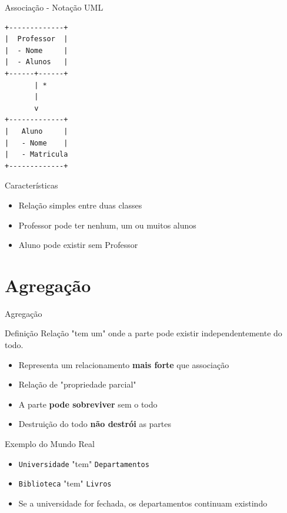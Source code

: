 \documentclass[aspectratio=169]{beamer}
\begin{document}
\begin{frame}[fragile]{Associação - Notação UML}
\begin{center}
\begin{verbatim}
+-------------+
|  Professor  |
|  - Nome     |
|  - Alunos   |
+------+------+
       | *
       |
       v
+-------------+
|   Aluno     |
|   - Nome    |
|   - Matricula
+-------------+
\end{verbatim}
\end{center}

\vspace{0.5cm}
\begin{block}{Características}
\begin{itemize}
\item Relação simples entre duas classes
\item Professor pode ter nenhum, um ou muitos alunos
\item Aluno pode existir sem Professor
\end{itemize}
\end{block}
\end{frame}

\section{Agregação}

\begin{frame}{Agregação}
\begin{block}{Definição}
Relação "tem um" onde a parte pode existir independentemente do todo.
\end{block}

\vspace{0.5cm}
\begin{itemize}
\item Representa um relacionamento \textbf{mais forte} que associação
\item Relação de "propriedade parcial"
\item A parte \textbf{pode sobreviver} sem o todo
\item Destruição do todo \textbf{não destrói} as partes
\end{itemize}

\vspace{0.5cm}
\begin{exampleblock}{Exemplo do Mundo Real}
\begin{itemize}
\item \texttt{Universidade} "tem" \texttt{Departamentos}
\item \texttt{Biblioteca} "tem" \texttt{Livros}
\item Se a universidade for fechada, os departamentos continuam existindo
\end{itemize}
\end{exampleblock}
\end{frame}
\end{document}
